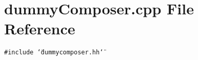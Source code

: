 \section{dummyComposer.cpp File Reference}
\label{dummyComposer_8cpp}


{\tt \#include \char`\"{}dummycomposer.hh\char`\"{}}\par
